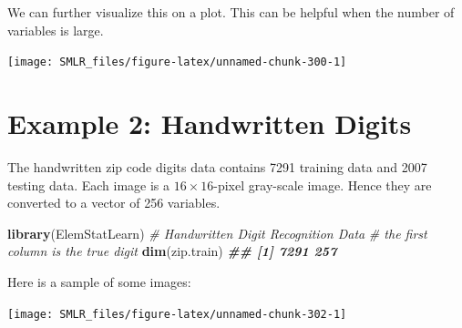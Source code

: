 \documentclass[
]{book}
\newenvironment{Shaded}{\begin{snugshade}}{\end{snugshade}}
\newcommand{\AttributeTok}[1]{\textcolor[rgb]{0.13,0.29,0.53}{#1}}
\newcommand{\CommentTok}[1]{\textcolor[rgb]{0.56,0.35,0.01}{\textit{#1}}}
\newcommand{\DecValTok}[1]{\textcolor[rgb]{0.00,0.00,0.81}{#1}}
\newcommand{\DocumentationTok}[1]{\textcolor[rgb]{0.56,0.35,0.01}{\textbf{\textit{#1}}}}
\newcommand{\FunctionTok}[1]{\textcolor[rgb]{0.13,0.29,0.53}{\textbf{#1}}}
\newcommand{\NormalTok}[1]{#1}
\newcommand{\OtherTok}[1]{\textcolor[rgb]{0.56,0.35,0.01}{#1}}
\newcommand{\SpecialCharTok}[1]{\textcolor[rgb]{0.81,0.36,0.00}{\textbf{#1}}}
\theoremstyle{definition}
\theoremstyle{definition}
\theoremstyle{definition}
\theoremstyle{definition}
\theoremstyle{remark}
\begin{document}
We can further visualize this on a plot. This can be helpful when the number of variables is large.

\begin{Shaded}
\end{Shaded}

\begin{center}\texttt{[image: SMLR\_files/figure-latex/unnamed-chunk-300-1]} \end{center}

\hypertarget{example-2-handwritten-digits}{%
\section{Example 2: Handwritten Digits}\label{example-2-handwritten-digits}}

The handwritten zip code digits data contains 7291 training data and 2007 testing data. Each image is a \(16 \times 16\)-pixel gray-scale image. Hence they are converted to a vector of 256 variables.

\begin{Shaded}
\begin{Highlighting}[]
    \FunctionTok{library}\NormalTok{(ElemStatLearn)}
    \CommentTok{\# Handwritten Digit Recognition Data}
    \CommentTok{\# the first column is the true digit}
    \FunctionTok{dim}\NormalTok{(zip.train)}
\DocumentationTok{\#\# [1] 7291  257}
\end{Highlighting}
\end{Shaded}

Here is a sample of some images:

\begin{center}\texttt{[image: SMLR\_files/figure-latex/unnamed-chunk-302-1]} \end{center}
\end{document}
